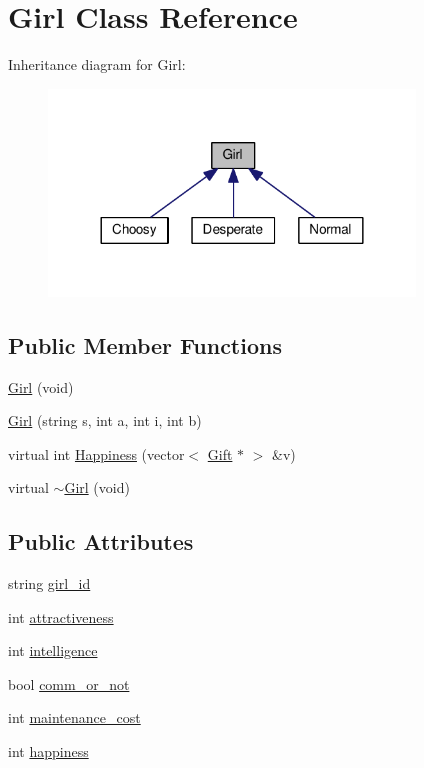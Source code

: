 \hypertarget{class_girl}{\section{Girl Class Reference}
\label{class_girl}
}


Inheritance diagram for Girl\-:
\nopagebreak
\begin{figure}[H]
\begin{center}
\leavevmode
\includegraphics[width=276pt]{class_girl__inherit__graph}
\end{center}
\end{figure}
\subsection*{Public Member Functions}
\begin{DoxyCompactItemize}
\item 
\hyperlink{class_girl_a42934942c9a398fae8463398e3027402}{Girl} (void)
\item 
\hyperlink{class_girl_a9155af9298b879c2090e94e3db1c4b3f}{Girl} (string s, int a, int i, int b)
\item 
virtual int \hyperlink{class_girl_a6e6cf742fe50e30131dc23e5156c2805}{Happiness} (vector$<$ \hyperlink{class_gift}{Gift} $\ast$ $>$ \&v)
\item 
virtual \hyperlink{class_girl_a26651f89a33ab583a7ce7a8eced8e3b0}{$\sim$\-Girl} (void)
\end{DoxyCompactItemize}
\subsection*{Public Attributes}
\begin{DoxyCompactItemize}
\item 
string \hyperlink{class_girl_a94e1817f90da8bc51ce59df0662e05a7}{girl\-\_\-id}
\item 
int \hyperlink{class_girl_ab97bd68f8bc0ab5ee3fb9d2784ed1474}{attractiveness}
\item 
int \hyperlink{class_girl_a751f8b9d8f1ba139d3f512eb198c16f4}{intelligence}
\item 
bool \hyperlink{class_girl_a2ca3116e88a8f4a91b242eabf3a66603}{comm\-\_\-or\-\_\-not}
\item 
int \hyperlink{class_girl_a6228b481bb77e727ed5538a2d5f71400}{maintenance\-\_\-cost}
\item 
int \hyperlink{class_girl_a50337447735a8f518fd817338d04d5b9}{happiness}
\end{DoxyCompactItemize}


